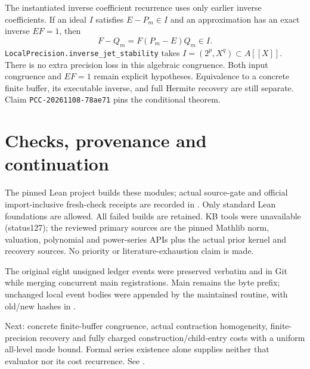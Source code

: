 \documentclass[10pt]{article}
\begin{document}
The instantiated inverse coefficient recurrence uses only earlier inverse
coefficients. If an ideal $I$ satisfies $E-P_m\in I$ and an approximation has
an exact inverse $EF=1$, then
\[F-Q_m=F(P_m-E)Q_m\in I.\]
\texttt{LocalPrecision.inverse\_jet\_stability} takes
$I=(2^p,X^q)\subset A[[X]]$. There is no extra precision loss in this
algebraic congruence. Both input congruence and $EF=1$ remain explicit
hypotheses. Equivalence to a concrete finite buffer, its executable inverse,
and full Hermite recovery are still separate. Claim
\texttt{PCC-20261108-78ae71} pins the conditional theorem.

\section*{Checks, provenance and continuation}
The pinned Lean project builds these modules; actual source-gate and official
import-inclusive fresh-check receipts are recorded in
. Only standard Lean foundations are
allowed. All failed builds are retained. KB tools were unavailable (status127);
the reviewed primary sources are the pinned Mathlib norm, valuation,
polynomial and power-series APIs plus the actual prior kernel and recovery
sources. No priority or literature-exhaustion claim is made.

The original eight unsigned ledger events were preserved verbatim and in Git
while merging concurrent main registrations. Main remains the byte prefix;
unchanged local event bodies were appended by the maintained routine, with
old/new hashes in .

Next: concrete finite-buffer congruence, actual contraction homogeneity,
finite-precision recovery and fully charged construction/child-entry costs
with a uniform all-level mode bound. Formal series existence alone supplies
neither that evaluator nor its cost recurrence. See .
\end{document}

